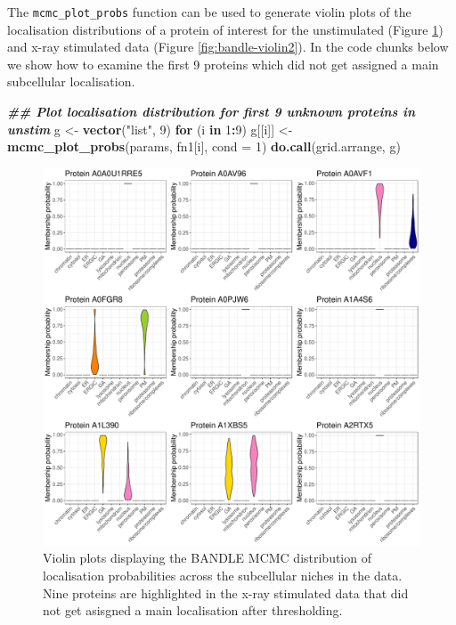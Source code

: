 \documentclass[9pt,a4paper,]{extarticle}
\newenvironment{Shaded}{\begin{snugshade}}{\end{snugshade}}
\newcommand{\AttributeTok}[1]{\textcolor[rgb]{0.13,0.29,0.53}{#1}}
\newcommand{\ControlFlowTok}[1]{\textcolor[rgb]{0.13,0.29,0.53}{\textbf{#1}}}
\newcommand{\DecValTok}[1]{\textcolor[rgb]{0.00,0.00,0.81}{#1}}
\newcommand{\DocumentationTok}[1]{\textcolor[rgb]{0.56,0.35,0.01}{\textbf{\textit{#1}}}}
\newcommand{\FunctionTok}[1]{\textcolor[rgb]{0.13,0.29,0.53}{\textbf{#1}}}
\newcommand{\NormalTok}[1]{#1}
\newcommand{\OtherTok}[1]{\textcolor[rgb]{0.56,0.35,0.01}{#1}}
\newcommand{\SpecialCharTok}[1]{\textcolor[rgb]{0.81,0.36,0.00}{\textbf{#1}}}
\newcommand{\StringTok}[1]{\textcolor[rgb]{0.31,0.60,0.02}{#1}}
\begin{document}
The \texttt{mcmc\_plot\_probs} function can be used to generate violin plots of the
localisation distributions of a protein of interest for the unstimulated (Figure
\ref{fig:bandle-violin1}) and x-ray stimulated data (Figure
\ref{fig:bandle-violin2}). In the code chunks below we show how to examine the
first 9 proteins which did not get assigned a main subcellular localisation.

\begin{Shaded}
\begin{Highlighting}[]
\DocumentationTok{\#\# Plot localisation distribution for first 9 unknown proteins in unstim}
\NormalTok{g }\OtherTok{\textless{}{-}} \FunctionTok{vector}\NormalTok{(}\StringTok{"list"}\NormalTok{, }\DecValTok{9}\NormalTok{)}
\ControlFlowTok{for}\NormalTok{ (i }\ControlFlowTok{in} \DecValTok{1}\SpecialCharTok{:}\DecValTok{9}\NormalTok{) }
\NormalTok{  g[[i]] }\OtherTok{\textless{}{-}} \FunctionTok{mcmc\_plot\_probs}\NormalTok{(params, fn1[i], }\AttributeTok{cond =} \DecValTok{1}\NormalTok{)}
\FunctionTok{do.call}\NormalTok{(grid.arrange, g)}
\end{Highlighting}
\end{Shaded}

\begin{figure}[H]

{\centering \includegraphics[width=1\linewidth,]{figs/unstim_unknown_violins} 

}

\caption{Violin plots displaying the BANDLE MCMC distribution of localisation probabilities across the subcellular niches in the data. Nine proteins are highlighted in the x-ray stimulated data that did not get asisgned a main localisation after thresholding.}\label{fig:bandle-violin1}
\end{figure}
\end{document}
